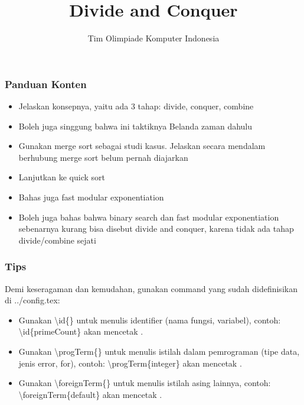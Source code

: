 

\title{Divide and Conquer}
\author{Tim Olimpiade Komputer Indonesia}
\date{}



\begin{frame}
\titlepage
\end{frame}

\begin{frame}
\frametitle{Panduan Konten}
\begin{itemize}
  \item Jelaskan konsepnya, yaitu ada 3 tahap: divide, conquer, combine
  \item Boleh juga singgung bahwa ini taktiknya Belanda zaman dahulu
  \item Gunakan merge sort sebagai studi kasus. Jelaskan secara mendalam berhubung merge sort belum pernah diajarkan
  \item Lanjutkan ke quick sort
  \item Bahas juga fast modular exponentiation
  \item Boleh juga bahas bahwa binary search dan fast modular exponentiation sebenarnya kurang bisa disebut divide and conquer, karena tidak ada tahap divide/combine sejati
\end{itemize}
\end{frame}

\begin{frame}
\frametitle{Tips}
Demi keseragaman dan kemudahan, gunakan command yang sudah didefinisikan di ../config.tex:
\begin{itemize}
  \item Gunakan \textbackslash id\{\} untuk menulis identifier (nama fungsi, variabel), contoh: \textbackslash id\{primeCount\} akan mencetak .
  \item Gunakan \textbackslash progTerm\{\} untuk menulis istilah dalam pemrograman (tipe data, jenis error, for), contoh: \textbackslash progTerm\{integer\} akan mencetak .
  \item Gunakan \textbackslash foreignTerm\{\} untuk menulis istilah asing lainnya, contoh: \textbackslash foreignTerm\{default\} akan mencetak .
\end{itemize}
\end{frame}

